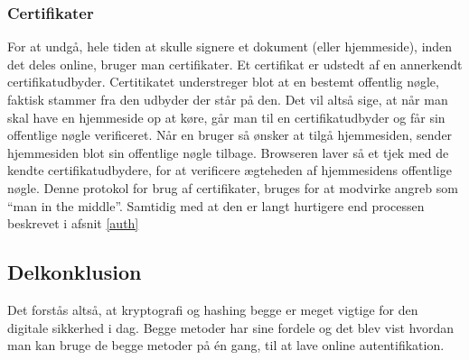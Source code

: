     \subsubsection{Certifikater}
    For at undgå, hele tiden at skulle signere et dokument (eller hjemmeside), inden det deles online, bruger man certifikater.\cite{cert}
    Et certifikat er udstedt af en annerkendt certifikatudbyder.
    Certitikatet understreger blot at en bestemt offentlig nøgle, faktisk stammer fra den udbyder der står på den.
    Det vil altså sige, at når man skal have en hjemmeside op at køre, går man til en certifikatudbyder og får sin offentlige nøgle verificeret.
    Når en bruger så ønsker at tilgå hjemmesiden, sender hjemmesiden blot sin offentlige nøgle tilbage.
    Browseren laver så et tjek med de kendte certifikatudbydere, for at verificere ægteheden af hjemmesidens offentlige nøgle.
    Denne protokol for brug af certifikater, bruges for at modvirke angreb som ``man in the middle''.
    Samtidig med at den er langt hurtigere end processen beskrevet i afsnit \ref{auth}





\subsection{Delkonklusion}
Det forstås altså, at kryptografi og hashing begge er meget vigtige for den digitale sikkerhed i dag.
Begge metoder har sine fordele og det blev vist hvordan man kan bruge de begge metoder på én gang, til at lave online autentifikation.
